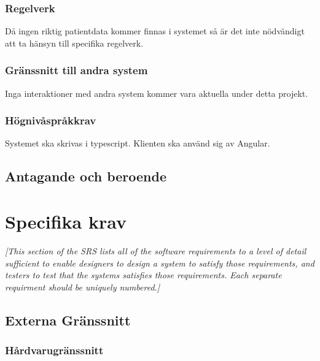 \documentclass{article}
\begin{document}
\begin{enumerate}
\subsubsection{Regelverk}
\label{subsec:Regelverk}
Då ingen riktig patientdata kommer finnas i systemet så är det inte nödvändigt
att ta hänsyn till specifika regelverk.

\subsubsection{Gränssnitt till andra system}
\label{subsec:Granssnitt till andra system}
Inga interaktioner med andra system kommer vara aktuella under detta projekt.

\subsubsection{Högnivåspråkkrav}
\label{subsec:Hognivasprakkrav}
Systemet ska skrivas i typescript. Klienten ska använd sig av Angular.

\subsection{Antagande och beroende}
\label{subsec:Antagande och beroende}

\section{Specifika krav}
\label{sec:Specifika krav}
\emph{[This section of the \ac{SRS} lists all of the software requirements to
  a level of detail sufficient to enable designers to design a system to
  satisfy those requirements, and testers to test that the systems satisfies
  those requirements. Each separate requirment should be uniquely numbered.]}

\subsection{Externa Gränssnitt}
\label{subsec:Externa Granssnitt}

\subsubsection{Hårdvarugränssnitt}
\label{subsec:EG-Hardvarugranssnitt}


\end{enumerate}
\end{document}
